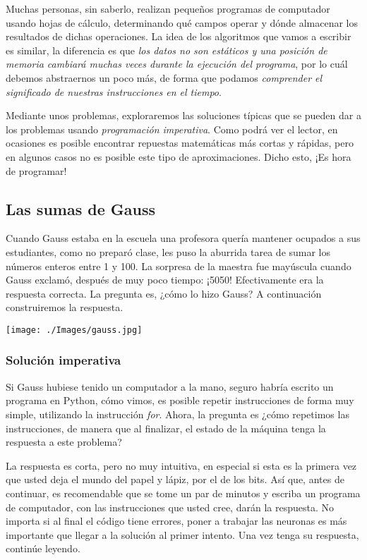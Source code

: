 Muchas personas, sin saberlo, realizan pequeños programas de computador usando hojas de cálculo, determinando qué campos operar y dónde almacenar los resultados de dichas operaciones. La idea de los algoritmos que vamos a escribir es similar, la diferencia es que \emph{los datos no son estáticos y una posición de memoria cambiará muchas veces durante la ejecución del programa}, por lo cuál debemos abstraernos un poco más, de forma que podamos \emph{comprender el significado de nuestras instrucciones en el tiempo}.

Mediante unos problemas, exploraremos las soluciones típicas que se pueden dar a los problemas usando \emph{programación imperativa}. Como podrá ver el lector, en ocasiones es posible encontrar repuestas matemáticas más cortas y rápidas, pero en algunos casos no es posible este tipo de aproximaciones. Dicho esto, ¡Es hora de programar!

\subsection{Las sumas de Gauss}

\begin{minipage}{.7\textwidth} 
Cuando Gauss estaba en la escuela una profesora quería mantener ocupados a sus estudiantes, como no preparó clase, les puso la aburrida tarea de sumar los números enteros entre 1 y 100. La sorpresa de la maestra fue mayúscula cuando Gauss exclamó, después de muy poco tiempo: ¡5050! Efectivamente era la respuesta correcta. La pregunta es, ¿cómo lo hizo Gauss? A continuación construiremos la respuesta.
\end{minipage}
\begin{minipage}{.30\textwidth}
  \centering
  \texttt{[image: ./Images/gauss.jpg]}
\end{minipage}

\subsubsection{Solución imperativa}
Si Gauss hubiese tenido un computador a la mano, seguro habría escrito un programa en Python, cómo vimos, es posible repetir instrucciones de forma muy simple, utilizando la instrucción \emph{for}. Ahora, la pregunta es ¿cómo repetimos las instrucciones, de manera que al finalizar, el estado de la máquina tenga la respuesta a este problema?

La respuesta es corta, pero no muy intuitiva, en especial si esta es la primera vez que usted deja el mundo del papel y lápiz, por el de los bits. Así que, antes de continuar, es recomendable que se tome un par de minutos y escriba un programa de computador, con las instrucciones que usted cree, darán la respuesta. No importa si al final el código tiene errores, poner a trabajar las neuronas es más importante que llegar a la solución al primer intento. Una vez tenga su respuesta, continúe leyendo.
\\

